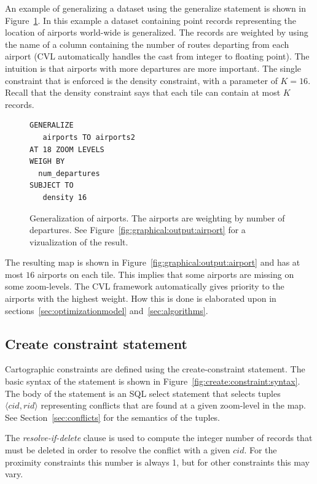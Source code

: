 An example of generalizing a dataset using the generalize statement is shown in Figure~\ref{fig:cvl:example:airports}. In this example a dataset containing point records representing the location of airports world-wide is generalized. The records are weighted by using the name of a column containing the number of routes departing from each airport (CVL automatically handles the cast from integer to floating point). The intuition is that airports with more departures are more important. The single constraint that is enforced is the density constraint, with a parameter of $K=16$. Recall that the density constraint says that each tile can contain at most $K$ records.

\begin{figure}[htbp]
\begin{center}
\begin{lstlisting}
GENERALIZE 
   airports TO airports2
AT 18 ZOOM LEVELS
WEIGH BY
  num_departures
SUBJECT TO 
   density 16 
\end{lstlisting}
\caption{Generalization of airports. The airports are weighting by number of departures. See Figure~\ref{fig:graphical:output:airport} for a vizualization of the result.}
\label{fig:cvl:example:airports}
\end{center}
\end{figure}

The resulting map is shown in Figure~\ref{fig:graphical:output:airport} and has at most $16$ airports on each tile. This implies that some airports are missing on some zoom-levels. The CVL framework automatically gives priority to the airports with the highest weight. How this is done is elaborated upon in sections~\ref{sec:optimizationmodel} and~\ref{sec:algorithms}.

\subsection{Create constraint statement}
\label{sec:create:constraint:statement}

Cartographic constraints are defined using the create-constraint statement.  The basic syntax of the statement is shown in Figure~\ref{fig:create:constraint:syntax}. The body of the statement is an SQL select statement that selects tuples $\langle cid, rid\rangle$ representing conflicts that are found at a given zoom-level in the map. See Section~\ref{sec:conflicts} for the semantics of the tuples.

The \emph{resolve-if-delete} clause is used to compute the integer number of records that must be deleted in order to resolve the conflict with a given $cid$. For the proximity constraints this number is always 1, but for other constraints this may vary.

